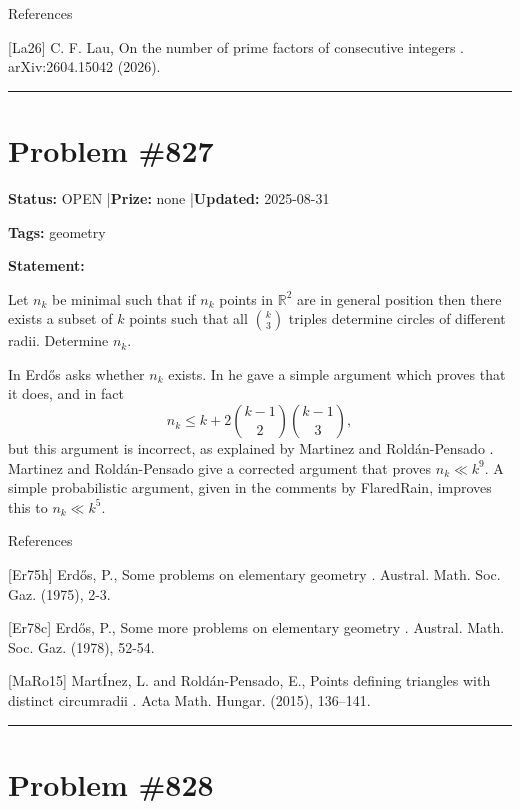 \documentclass{article}
\begin{document}
References

[La26] C. F. Lau, On the number of prime factors of consecutive integers . arXiv:2604.15042 (2026).

\noindent\rule{\linewidth}{0.4pt}


\section{Problem \#827}
\label{prob:827}

\noindent\textbf{Status:} OPEN \quad|\quad \textbf{Prize:} none \quad|\quad \textbf{Updated:} 2025-08-31

\noindent\textbf{Tags:} geometry

\medskip

\noindent\textbf{Statement:}

Let $n_k$ be minimal such that if $n_k$ points in $\mathbb{R}^2$ are in general position then there exists a subset of $k$ points such that all $\binom{k}{3}$ triples determine circles of different radii. Determine $n_k$.




In \cite{Er75h} Erd\H{o}s asks whether $n_k$ exists. In \cite{Er78c} he gave a simple argument which proves that it does, and in fact\[n_k \leq k+2\binom{k-1}{2}\binom{k-1}{3},\]but this argument is incorrect, as explained by Martinez and Rold\'{a}n-Pensado \cite{MaRo15}. Martinez and Rold\'{a}n-Pensado give a corrected argument that proves $n_k\ll k^9$. A simple probabilistic argument, given in the comments by FlaredRain, improves this to $n_k\ll k^5$.




References

[Er75h] Erd\H{o}s, P., Some problems on elementary geometry . Austral. Math. Soc. Gaz. (1975), 2-3.

[Er78c] Erd\H{o}s, P., Some more problems on elementary geometry . Austral. Math. Soc. Gaz. (1978), 52-54.

[MaRo15] Mart\'Inez, L. and Rold\'{a}n-Pensado, E., Points defining triangles with distinct circumradii . Acta Math. Hungar. (2015), 136--141.

\noindent\rule{\linewidth}{0.4pt}


\section{Problem \#828}
\label{prob:828}
\end{document}
